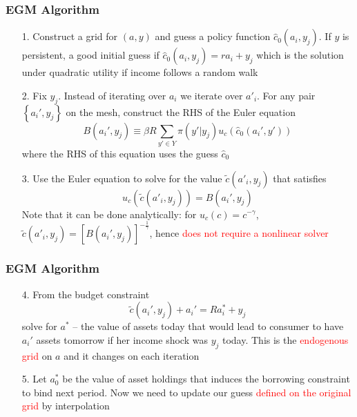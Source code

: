 \documentclass[aspectratio=169, 11pt]{beamer}
\begin{document}
\begin{frame}
\frametitle{EGM Algorithm}
  \begin{itemize}
    \item[1.] Construct a grid for $(a,y)$ and guess a policy function $\hat{c}_{0}(a_{i},y_{j})$. If $y$ is persistent, a good initial guess if $\hat{c}_{0}(a_{i},y_{j})=ra_{i}+y_{j}$ which is the solution under quadratic utility if income follows a random walk
    \medskip
    \item[2.] Fix $y_{j}$. Instead of iterating over $a_{i}$ we iterate over $a'_{i}$. For any pair $\left\{ a_{i}',y_{j}\right\}$ on the mesh, construct the RHS of the Euler equation
    \[
      B\left(a_{i}',y_{j}\right)\equiv\beta R\sum_{y'\in Y}\pi\left(y'|y_{j}\right)u_{c}\left(\hat{c}_{0}\left(a_{i}',y'\right)\right)
    \]
    where the RHS of this equation uses the guess $\hat{c}_{0}$
    \medskip
    \item[3.] Use the Euler equation to solve for the value $\tilde{c}\left(a'_{i},y_{j}\right)$ that satisfies
    \[
      u_{c}\left(\tilde{c}\left(a'_{i},y_{j}\right)\right)=B\left(a_{i}',y_{j}\right)
    \]
    Note that it can be done analytically: for $u_c(c)=c^{-\gamma}$, $\tilde{c}\left(a'_{i},y_{j}\right)=\left[B\left(a_{i}',y_{j}\right)\right]^{-\frac{1}{\gamma}}$, hence \textcolor{red}{does not require a nonlinear solver}
  \end{itemize}
\end{frame}

\begin{frame}
\frametitle{EGM Algorithm}
  \begin{itemize}
    \item[4.] From the budget constraint
    \[
      \tilde{c}\left(a_{i}',y_{j}\right)+a_{i}'=Ra_{i}^{*}+y_{j}
    \]
    solve for $a^{*}$ -- the value of assets today that would lead to consumer to have $a_{i}'$ assets tomorrow if her income shock was $y_{j}$ today. This is the \textcolor{red}{endogenous grid} on $a$ and it changes on each iteration
    \bigskip
    \item[5.] Let $a_{0}^{*}$ be the value of asset holdings that induces the borrowing constraint to bind next period. Now we need to update our guess \textcolor{red}{defined on the original grid} by interpolation
  \end{itemize}
\end{frame}
\end{document}
